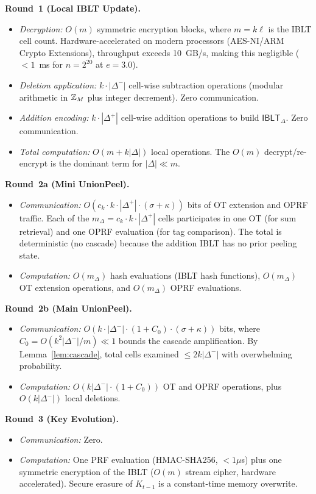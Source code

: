 \smallskip\noindent\textbf{Round~1 (Local IBLT Update).}
\begin{itemize}
\item \emph{Decryption:} $O(m)$ symmetric encryption blocks, where $m = k\ell$ is the
IBLT cell count. Hardware-accelerated on modern processors (AES-NI/ARM
Crypto Extensions), throughput exceeds 10~GB/s, making this negligible
($<1$~ms for $n = 2^{20}$ at $e = 3.0$).
\item \emph{Deletion application:} $k \cdot |\Delta^-|$ cell-wise subtraction
operations (modular arithmetic in $\mathbb{Z}_M$ plus integer decrement). Zero
communication.
\item \emph{Addition encoding:} $k \cdot |\Delta^+|$ cell-wise addition
operations to build $\mathsf{IBLT}_{\Delta}$. Zero communication.
\item \emph{Total computation:} $O(m + k|\Delta|)$ local operations. The
$O(m)$ decrypt/re-encrypt is the dominant term for $|\Delta| \ll m$.
\end{itemize}

\medskip\noindent\textbf{Round~2a (Mini UnionPeel).}
\begin{itemize}
\item \emph{Communication:} $O(c_k \cdot k \cdot |\Delta^+| \cdot (\sigma +
\kappa))$ bits of OT extension and OPRF traffic. Each of the
$m_{\Delta} = c_k \cdot k \cdot |\Delta^+|$ cells participates in one OT
(for sum retrieval) and one OPRF evaluation (for tag comparison). The total
is deterministic (no cascade) because the addition IBLT has no prior peeling
state.
\item \emph{Computation:} $O(m_{\Delta})$ hash evaluations (IBLT hash
functions), $O(m_{\Delta})$ OT extension operations, and $O(m_{\Delta})$
OPRF evaluations.
\end{itemize}

\smallskip\noindent\textbf{Round~2b (Main UnionPeel).}
\begin{itemize}
\item \emph{Communication:} $O(k \cdot |\Delta^-| \cdot (1 + C_0) \cdot
(\sigma + \kappa))$ bits, where $C_0 = O(k^2|\Delta^-|/m) \ll 1$ bounds
the cascade amplification. By Lemma~\ref{lem:cascade}, total cells examined
$\leq 2k|\Delta^-|$ with overwhelming probability.
\item \emph{Computation:} $O(k|\Delta^-| \cdot (1 + C_0))$ OT and OPRF
operations, plus $O(k|\Delta^-|)$ local deletions.
\end{itemize}

\smallskip\noindent\textbf{Round~3 (Key Evolution).}
\begin{itemize}
\item \emph{Communication:} Zero.
\item \emph{Computation:} One PRF evaluation (HMAC-SHA256, $<1\mu$s) plus
one symmetric encryption of the IBLT ($O(m)$ stream cipher, hardware
accelerated). Secure erasure of $K_{t-1}$ is a constant-time memory
overwrite.
\end{itemize}

